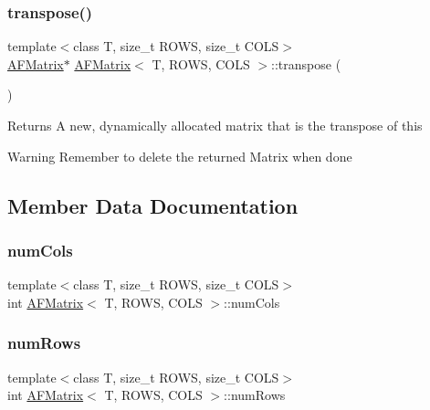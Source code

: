 \subsubsection{\texorpdfstring{transpose()}{transpose()}\hspace{0.1cm}{\footnotesize\ttfamily [2/2]}}
{\footnotesize\ttfamily template$<$class T, size\+\_\+t R\+O\+WS, size\+\_\+t C\+O\+LS$>$ \\
\hyperlink{class_a_f_matrix}{A\+F\+Matrix}$\ast$ \hyperlink{class_a_f_matrix}{A\+F\+Matrix}$<$ T, R\+O\+WS, C\+O\+LS $>$\+::transpose (\begin{DoxyParamCaption}{ }\end{DoxyParamCaption})\hspace{0.3cm}{\ttfamily [inline]}}

\begin{DoxyReturn}{Returns}
A new, dynamically allocated matrix that is the transpose of this 
\end{DoxyReturn}
\begin{DoxyWarning}{Warning}
Remember to delete the returned Matrix when done 
\end{DoxyWarning}


\subsection{Member Data Documentation}
\mbox{\label{class_a_f_matrix_aed28746540fcca94d5d1448b098b4ecc}} 
\subsubsection{\texorpdfstring{num\+Cols}{numCols}}
{\footnotesize\ttfamily template$<$class T, size\+\_\+t R\+O\+WS, size\+\_\+t C\+O\+LS$>$ \\
int \hyperlink{class_a_f_matrix}{A\+F\+Matrix}$<$ T, R\+O\+WS, C\+O\+LS $>$\+::num\+Cols}

\mbox{\label{class_a_f_matrix_a8e18ed7d084bfa8b040f7abd89918b42}} 
\subsubsection{\texorpdfstring{num\+Rows}{numRows}}
{\footnotesize\ttfamily template$<$class T, size\+\_\+t R\+O\+WS, size\+\_\+t C\+O\+LS$>$ \\
int \hyperlink{class_a_f_matrix}{A\+F\+Matrix}$<$ T, R\+O\+WS, C\+O\+LS $>$\+::num\+Rows}

